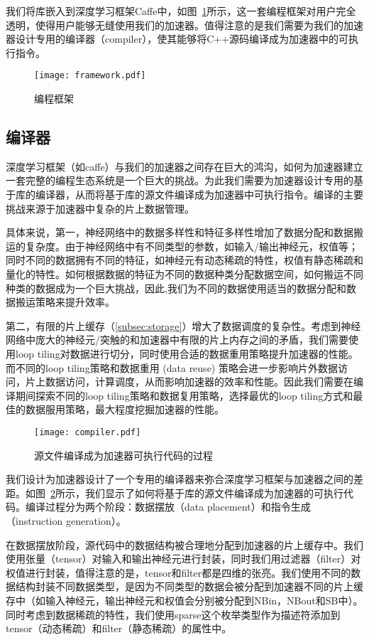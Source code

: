 我们将库嵌入到深度学习框架Caffe中，如图~\ref{fig:framework}所示，这一套编程框架对用户完全透明，使得用户能够无缝使用我们的加速器。值得注意的是我们需要为我们的加速器设计专用的编译器（compiler），使其能够将C++源码编译成为加速器中的可执行指令。

\begin{figure}
\centering
\texttt{[image: framework.pdf]}
\caption{编程框架}
\label{fig:framework}
\end{figure}

\subsection{编译器}
深度学习框架（如caffe）与我们的加速器之间存在巨大的鸿沟，如何为加速器建立一套完整的编程生态系统是一个巨大的挑战。为此我们需要为加速器设计专用的基于库的编译器，从而将基于库的源文件编译成为加速器中可执行指令。编译的主要挑战来源于加速器中复杂的片上数据管理。

具体来说，第一，神经网络中的数据多样性和特征多样性增加了数据分配和数据搬运的复杂度。由于神经网络中有不同类型的参数，如输入/输出神经元，权值等；同时不同的数据拥有不同的特征，如神经元有动态稀疏的特性，权值有静态稀疏和量化的特性。如何根据数据的特征为不同的数据种类分配数据空间，如何搬运不同种类的数据成为一个巨大挑战，因此,我们为不同的数据使用适当的数据分配和数据搬运策略来提升效率。

第二，有限的片上缓存（\ref{subsec:storage}）增大了数据调度的复杂性。考虑到神经网络中庞大的神经元/突触的和加速器中有限的片上内存之间的矛盾，我们需要使用loop tiling对数据进行切分，同时使用合适的数据重用策略提升加速器的性能。而不同的loop tiling策略和数据重用 (data reuse) 策略会进一步影响片外数据访问，片上数据访问，计算调度，从而影响加速器的效率和性能。因此我们需要在编译期间探索不同的loop tiling策略和数据复用策略，选择最优的loop tiling方式和最佳的数据服用策略，最大程度挖掘加速器的性能。

\begin{figure}[h]

\centering
\texttt{[image: compiler.pdf]}
\caption{源文件编译成为加速器可执行代码的过程}
\label{fig:compiler}
\end{figure}

我们设计为加速器设计了一个专用的编译器来弥合深度学习框架与加速器之间的差距。如图~\ref{fig:compiler}所示，我们显示了如何将基于库的源文件编译成为加速器的可执行代码。编译过程分为两个阶段：数据摆放（data placement）和指令生成（instruction generation）。

在数据摆放阶段，源代码中的数据结构被合理地分配到加速器的片上缓存中。我们使用张量（tensor）对输入和输出神经元进行封装，同时我们用过滤器（filter）对权值进行封装，值得注意的是，tensor和filter都是四维的张亮。我们使用不同的数据结构封装不同数据类型，是因为不同类型的数据会被分配到加速器不同的片上缓存中（如输入神经元，输出神经元和权值会分别被分配到NBin，NBout和SB中）。同时考虑到数据稀疏的特性，我们使用sparse这个枚举类型作为描述符添加到tensor（动态稀疏）和filter（静态稀疏）的属性中。

